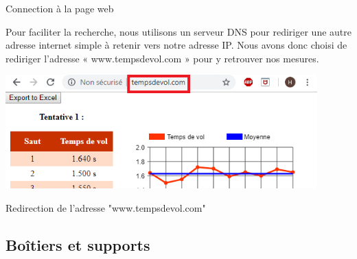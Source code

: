 \begin{center}
    
    Connection à la page web
\end{center}

\normalsize
Pour faciliter la recherche, nous utilisons un serveur DNS pour rediriger une autre adresse internet simple à retenir vers notre adresse IP. Nous avons donc choisi de rediriger l’adresse « www.tempsdevol.com » pour y retrouver nos mesures.

\begin{center}
    \includegraphics[width=0.9\textwidth]{photoHugo/Capture1}

    Redirection de l'adresse "www.tempsdevol.com"
\end{center}

\normalsize
\subsection{Boîtiers et supports}
